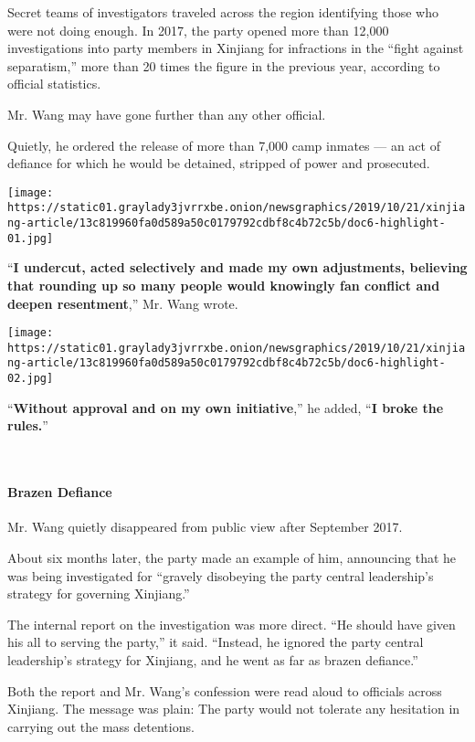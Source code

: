 Secret teams of investigators traveled across the region identifying
those who were not doing enough. In 2017, the party opened more than
12,000 investigations into party members in Xinjiang for infractions in
the ``fight against separatism,'' more than 20 times the figure in the
previous year, according to official statistics.

Mr. Wang may have gone further than any other official.

Quietly, he ordered the release of more than 7,000 camp inmates --- an
act of defiance for which he would be detained, stripped of power and
prosecuted.

\texttt{[image: https://static01.graylady3jvrrxbe.onion/newsgraphics/2019/10/21/xinjiang-article/13c819960fa0d589a50c0179792cdbf8c4b72c5b/doc6-highlight-01.jpg]}

``\textbf{I undercut, acted selectively and made my own adjustments,
believing that rounding up so many people would knowingly fan conflict
and deepen resentment},'' Mr. Wang wrote.

\texttt{[image: https://static01.graylady3jvrrxbe.onion/newsgraphics/2019/10/21/xinjiang-article/13c819960fa0d589a50c0179792cdbf8c4b72c5b/doc6-highlight-02.jpg]}

``\textbf{Without approval and on my own initiative},'' he added,
``\textbf{I broke the rules.}''

​

\hypertarget{-brazen-defiance-}{%
\paragraph{ Brazen Defiance }\label{-brazen-defiance-}}

Mr. Wang quietly disappeared from public view after September 2017.

About six months later, the party made an example of him, announcing
that he was being investigated for ``gravely disobeying the party
central leadership's strategy for governing Xinjiang.''

The internal report on the investigation was more direct. ``He should
have given his all to serving the party,'' it said. ``Instead, he
ignored the party central leadership's strategy for Xinjiang, and he
went as far as brazen defiance.''

Both the report and Mr. Wang's confession were read aloud to officials
across Xinjiang. The message was plain: The party would not tolerate any
hesitation in carrying out the mass detentions.

